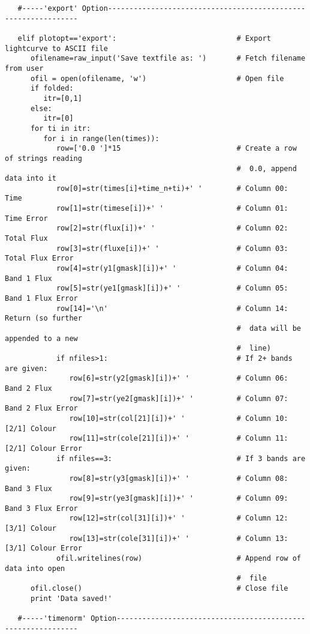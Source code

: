 \begin{verbatim}
   #-----'export' Option---------------------------------------------------------------

   elif plotopt=='export':                            # Export lightcurve to ASCII file
      ofilename=raw_input('Save textfile as: ')       # Fetch filename from user
      ofil = open(ofilename, 'w')                     # Open file
      if folded:
         itr=[0,1]
      else:
         itr=[0]
      for ti in itr:
         for i in range(len(times)):
            row=['0.0 ']*15                           # Create a row of strings reading
                                                      #  0.0, append data into it
            row[0]=str(times[i]+time_n+ti)+' '        # Column 00: Time
            row[1]=str(timese[i])+' '                 # Column 01: Time Error
            row[2]=str(flux[i])+' '                   # Column 02: Total Flux
            row[3]=str(fluxe[i])+' '                  # Column 03: Total Flux Error
            row[4]=str(y1[gmask][i])+' '              # Column 04: Band 1 Flux
            row[5]=str(ye1[gmask][i])+' '             # Column 05: Band 1 Flux Error
            row[14]='\n'                              # Column 14: Return (so further
                                                      #  data will be appended to a new
                                                      #  line)
            if nfiles>1:                              # If 2+ bands are given:
               row[6]=str(y2[gmask][i])+' '           # Column 06: Band 2 Flux
               row[7]=str(ye2[gmask][i])+' '          # Column 07: Band 2 Flux Error
               row[10]=str(col[21][i])+' '            # Column 10: [2/1] Colour
               row[11]=str(cole[21][i])+' '           # Column 11: [2/1] Colour Error
            if nfiles==3:                             # If 3 bands are given:
               row[8]=str(y3[gmask][i])+' '           # Column 08: Band 3 Flux
               row[9]=str(ye3[gmask][i])+' '          # Column 09: Band 3 Flux Error
               row[12]=str(col[31][i])+' '            # Column 12: [3/1] Colour
               row[13]=str(cole[31][i])+' '           # Column 13: [3/1] Colour Error
            ofil.writelines(row)                      # Append row of data into open
                                                      #  file
      ofil.close()                                    # Close file
      print 'Data saved!'

   #-----'timenorm' Option-------------------------------------------------------------
   

\end{verbatim}
